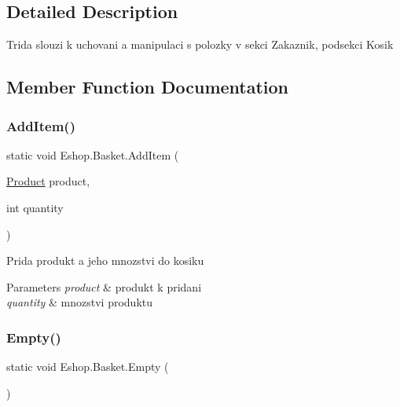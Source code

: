\subsection{Detailed Description}
Trida slouzi k uchovani a manipulaci s polozky v sekci Zakaznik, podsekci Kosik 



\subsection{Member Function Documentation}
\mbox{\label{class_eshop_1_1_basket_ae448262dd74f9291cec930964e9a3341}} 
\subsubsection{\texorpdfstring{AddItem()}{AddItem()}}
{\footnotesize\ttfamily static void Eshop.\+Basket.\+Add\+Item (\begin{DoxyParamCaption}\item[{\mbox{\hyperlink{class_eshop_1_1_product}{Product}}}]{product,  }\item[{int}]{quantity }\end{DoxyParamCaption})\hspace{0.3cm}{\ttfamily [static]}}



Prida produkt a jeho mnozstvi do kosiku 


\begin{DoxyParams}{Parameters}
{\em product} & produkt k pridani\\
\hline
{\em quantity} & mnozstvi produktu\\
\hline
\end{DoxyParams}
\mbox{\label{class_eshop_1_1_basket_ab239f0bfeb6845c0f8ee3eab9d5e5fc8}} 
\subsubsection{\texorpdfstring{Empty()}{Empty()}}
{\footnotesize\ttfamily static void Eshop.\+Basket.\+Empty (\begin{DoxyParamCaption}{ }\end{DoxyParamCaption})\hspace{0.3cm}{\ttfamily [static]}}



